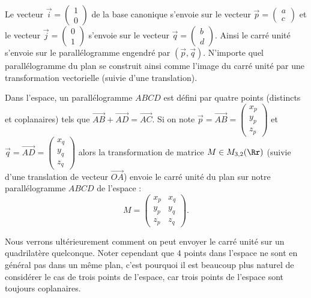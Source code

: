 \documentclass[11pt,class=report,crop=false]{standalone}
\begin{document}
Le vecteur $\vec{i} = \left( \begin{smallmatrix} 1 \\ 0 \end{smallmatrix} \right)$ de la base canonique s'envoie sur le vecteur $\vec{p} = \left( \begin{smallmatrix} a \\ c \end{smallmatrix} \right)$
et le vecteur $\vec{j} = \left( \begin{smallmatrix} 0 \\ 1 \end{smallmatrix} \right)$ s'envoie sur le vecteur $\vec{q} = \left( \begin{smallmatrix} b \\ d \end{smallmatrix} \right)$.
Ainsi le carré unité s'envoie sur le parallélogramme engendré par $(\vec p, \vec q)$.
N'importe quel parallélogramme du plan se construit ainsi comme l'image du carré unité par une transformation vectorielle (suivie d'une translation).



\medskip

Dans l'espace, un parallélogramme $ABCD$ est défini par quatre points (distincts et coplanaires) tels que $\vec{AB} + \vec{AD} = \vec{AC}$.
Si on note $\vec{p} = \vec{AB} = \left( \begin{smallmatrix} x_p \\ y_p \\ z_p \end{smallmatrix} \right)$
et $\vec{q} = \vec{AD} = \left( \begin{smallmatrix} x_q \\ y_q \\ z_q \end{smallmatrix} \right)$ alors
la transformation de matrice $M \in M_{3,2}(\Rr)$ (suivie d'une translation de vecteur $\vec{OA}$) envoie le carré unité du plan sur notre parallélogramme $ABCD$ de l'espace :
$$M = \begin{pmatrix} x_p & x_q \\ y_p & y_q \\ z_p & z_q \end{pmatrix}.$$


Nous verrons ultérieurement comment on peut envoyer le carré unité sur un quadrilatère quelconque.
Noter cependant que $4$ points dans l'espace ne sont en général pas dans un même plan, c'est pourquoi il est beaucoup plus naturel de considérer le cas de trois points de l'espace, car trois points de l'espace sont toujours coplanaires.
\end{document}
